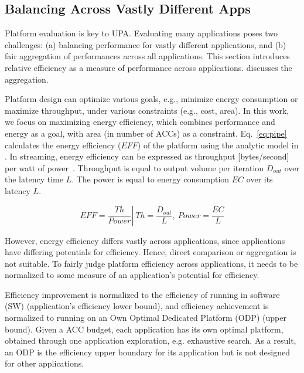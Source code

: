\vspace{-2pt}
\subsection{Balancing Across Vastly Different Apps}
\label{subsec:relativeEff}

Platform evaluation is key to UPA. Evaluating many applications poses two challenges: (a) balancing performance for vastly different applications, and (b) fair aggregation of performances across all applications. This section introduces relative efficiency as a measure of performance across applications.  discusses the aggregation.

Platform design can optimize various goals, e.g., minimize energy consumption or maximize throughput, under various constraints (e.g., cost, area). In this work, we focus on maximizing energy efficiency, which combines performance and energy as a goal, with area (in number of ACCs) as a constraint. Eq.~\eqref{eq:pipe} calculates the energy efficiency ($EFF$) of the platform using the analytic model in . In streaming, energy efficiency can be expressed as throughput [bytes/second] per watt of power~\cite{zhou2013energy}. Throughput is equal to output volume per iteration $D_{out}$ over the latency time $L$. The power is equal to energy consumption $EC$ over its latency $L$.

\vspace{-8pt}
\begin{equation}
	EFF = \left. \frac{Th}{Power} \right\vert\ Th = \frac{D_{out}}{L},\ Power = \frac{EC}{L}
\label{eq:pipe}
\end{equation}

However, energy efficiency differs vastly across applications, since applications have differing potentials for efficiency. Hence, direct comparison or aggregation is not suitable. To fairly judge platform efficiency across applications, it needs to be normalized to some measure of an application's potential for efficiency.

Efficiency improvement is normalized to the efficiency of running in software (SW) (application's efficiency lower bound), and efficiency achievement is normalized to running on an Own Optimal Dedicated Platform (ODP) (upper bound). Given a ACC budget, each application has its own optimal platform, obtained through one application exploration, e.g. exhaustive search. As a result, an ODP is the efficiency upper boundary for its application but is not designed for other applications.

